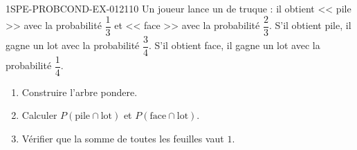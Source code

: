 \begin{exercice}{1SPE-PROBCOND-EX-012}{1}{10}
Un joueur lance un de truque : il obtient << pile >> avec la probabilité $\dfrac{1}{3}$ et << face >> avec la probabilité $\dfrac{2}{3}$. S'il obtient pile, il gagne un lot avec la probabilité $\dfrac{3}{4}$. S'il obtient face, il gagne un lot avec la probabilité $\dfrac{1}{4}$.

\begin{enumerate}
  \item Construire l'arbre pondere.
  \item Calculer $P(\text{pile} \cap \text{lot})$ et $P(\text{face} \cap \text{lot})$.
  \item Vérifier que la somme de toutes les feuilles vaut $1$.
\end{enumerate}
\end{exercice}
